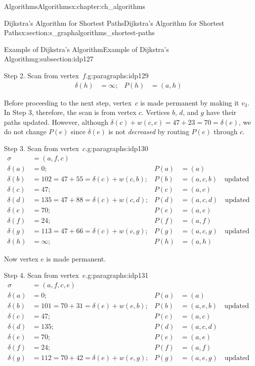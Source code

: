 \documentclass[oneside,10pt,]{book}
\numberwithin{equation}{section}
\newcommand{\amp}{&}
\begin{document}
\begin{chapterptx}{Algorithms}{}{Algorithms}{}{}{x:chapter:ch_algorithms}
\begin{sectionptx}{Dijkstra's Algorithm for Shortest Paths}{}{Dijkstra's Algorithm for Shortest Paths}{}{}{x:section:s_graphalgorithms_shortest-paths}
\begin{subsectionptx}{Example of Dijkstra's Algorithm}{}{Example of Dijkstra's Algorithm}{}{}{g:subsection:idp127}
\begin{paragraphs}{Step 2.  Scan from vertex~\(f\).}{g:paragraphs:idp129}
\begin{align*}
\delta(h)\amp=\infty; \amp P(h)\amp=(a,h)
\end{align*}
%
\par
Before proceeding to the next step, vertex~\(c\) is made permanent by making it \(v_3\). In Step 3, therefore, the scan is from vertex \(c\). Vertices \(b\), \(d\), and \(g\) have their paths updated. However, although \(\delta(c) + w(c,e) = 47+23=70=\delta(e)\), we do not change \(P(e)\) since \(\delta(e)\) is not \emph{decreased} by routing \(P(e)\) through \(c\).%
\end{paragraphs}%
\begin{paragraphs}{Step 3.  Scan from vertex~\(c\).}{g:paragraphs:idp130}%
%
\begin{align*}
\sigma\amp=(a,f,c)\\
\delta(a)\amp=0; \amp P(a)\amp=(a)\\
\delta(b)\amp=102=47+55= \delta(c)+w(c,b); \amp P(b)\amp=(a,c,b)\quad\text{updated}\\
\delta(c)\amp=47; \amp P(c)\amp=(a,c)\\
\delta(d)\amp=135=47+88 = \delta(c)+w(c,d); \amp P(d)\amp=(a,c,d)\quad\text{updated} \\
\delta(e)\amp=70; \amp P(e)\amp=(a,e)\\
\delta(f)\amp=24; \amp P(f)\amp=(a,f)\\
\delta(g)\amp=113=47+66= \delta(c)+w(c,g); \amp P(g)\amp=(a,c,g)\quad\text{updated} \\
\delta(h)\amp=\infty; \amp P(h)\amp=(a,h)
\end{align*}
%
\par
Now vertex \(e\) is made permanent.%
\end{paragraphs}%
\begin{paragraphs}{Step 4.  Scan from vertex~\(e\).}{g:paragraphs:idp131}%
%
\begin{align*}
\sigma\amp=(a,f,c,e)\\
\delta(a)\amp=0; \amp P(a)\amp=(a)\\
\delta(b)\amp=101=70+31= \delta(e)+w(e,b); \amp P(b)\amp=(a,e,b)\quad\text{updated}\\
\delta(c)\amp=47; \amp P(c)\amp=(a,c)\\
\delta(d)\amp=135; \amp P(d)\amp=(a,c,d)\\
\delta(e)\amp=70; \amp P(e)\amp=(a,e)\\
\delta(f)\amp=24; \amp P(f)\amp=(a,f)\\
\delta(g)\amp=112=70+42= \delta(e)+w(e,g); \amp P(g)\amp=(a,e,g)\quad\text{updated}\\

\end{align*}
\end{paragraphs}
\end{subsectionptx}
\end{sectionptx}
\end{chapterptx}
\end{document}
